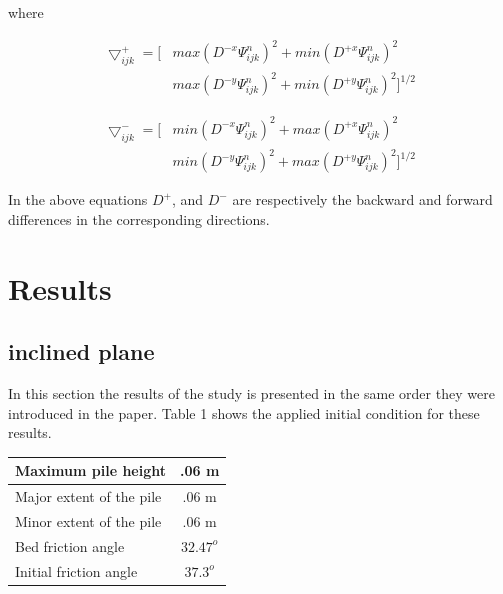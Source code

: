 \documentclass[letterpaper,10pt]{article}
\begin{document}
where 

\begin{equation}
\begin{aligned}
 \bigtriangledown_{ijk}^{+} = \big[ & max(D^{-x}\varPsi_{ijk}^{n})^2 + min(D^{+x}\varPsi_{ijk}^{n})^2
 \\& max(D^{-y}\varPsi_{ijk}^{n})^2 + min(D^{+y}\varPsi_{ijk}^{n})^2 \big]^{1/2}
\end{aligned}
\end{equation}
 
\begin{equation}
\begin{aligned}
 \bigtriangledown_{ijk}^{-} = \big[ & min(D^{-x}\varPsi_{ijk}^{n})^2 + max(D^{+x}\varPsi_{ijk}^{n})^2
 \\& min(D^{-y}\varPsi_{ijk}^{n})^2 + max(D^{+y}\varPsi_{ijk}^{n})^2 \big]^{1/2}
\end{aligned}
\end{equation} 

In the above equations $D^+$, and $D^-$ are  respectively the backward and forward differences in the corresponding directions.


\section{Results} \label{results}
\subsection{inclined plane}
In this section the results of the study is presented in the same order they were introduced in the paper.
Table 1 shows the applied initial condition for these results.
\begin{center}
 
\begin{tabular}{|l|c|}

\hline
Maximum pile height       & .06 m \\
\hline
Major extent of the pile  & .06 m \\
\hline
Minor extent of the pile  & .06 m \\
\hline           
Bed friction angle        & $32.47^o$ \\
\hline
Initial friction angle    & $37.3^o$ \\
\hline
\end{tabular}
\end{center}
\end{document}
